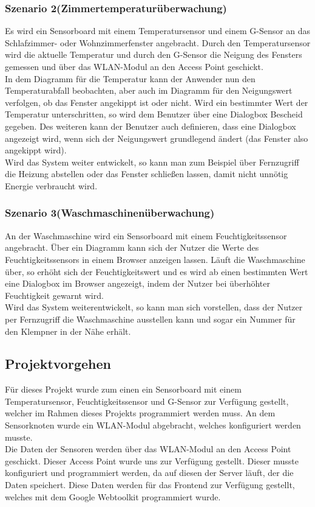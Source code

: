 \documentclass[12pt,a4paper,twoside]{article}
\begin{document}
\subsubsection{Szenario 2(Zimmertemperaturüberwachung)}
Es wird ein Sensorboard mit einem Temperatursensor und einem G-Sensor an das Schlafzimmer- oder Wohnzimmerfenster angebracht. Durch den Temperatursensor wird die aktuelle Temperatur und durch den G-Sensor die Neigung des Fensters gemessen und über das WLAN-Modul an den Access Point geschickt. \\
In dem Diagramm für die Temperatur kann der Anwender nun den Temperaturabfall beobachten, aber auch im Diagramm für den Neigungswert verfolgen, ob das Fenster angekippt ist oder nicht.
Wird ein bestimmter Wert der Temperatur unterschritten, so wird dem Benutzer über eine Dialogbox Bescheid gegeben. Des weiteren kann der Benutzer auch definieren, dass eine Dialogbox angezeigt wird, wenn sich der Neigungswert grundlegend ändert (das Fenster also angekippt wird). \\
Wird das System weiter entwickelt, so kann man zum Beispiel über Fernzugriff die Heizung abstellen oder das Fenster schließen lassen, damit nicht unnötig Energie verbraucht wird.

\subsubsection{Szenario 3(Waschmaschinenüberwachung)}
An der Waschmaschine wird ein Sensorboard mit einem Feuchtigkeitssensor angebracht. Über ein Diagramm kann sich der Nutzer die Werte des Feuchtigkeitssensors in einem Browser anzeigen lassen. Läuft die Waschmaschine über, so erhöht sich der Feuchtigkeitswert und es wird ab einen bestimmten Wert eine Dialogbox im Browser angezeigt, indem der Nutzer bei überhöhter Feuchtigkeit gewarnt wird. \\
Wird das System weiterentwickelt, so kann man sich vorstellen, dass der Nutzer per Fernzugriff die Waschmaschine ausstellen kann und sogar ein Nummer für den Klempner in der Nähe erhält.

\subsection{Projektvorgehen}
Für dieses Projekt wurde zum einen ein Sensorboard mit einem Temperatursensor, Feuchtigkeitssensor und G-Sensor zur Verfügung gestellt, welcher im Rahmen dieses Projekts programmiert werden muss. An dem Sensorknoten wurde ein WLAN-Modul abgebracht, welches konfiguriert werden musste.\\
Die Daten der Sensoren werden über das WLAN-Modul an den Access Point geschickt. Dieser Access Point wurde uns zur Verfügung gestellt. Dieser musste konfiguriert und programmiert werden, da auf diesen der Server läuft, der die Daten speichert. Diese Daten werden für das Frontend zur Verfügung gestellt, welches mit dem Google Webtoolkit programmiert wurde. 
\end{document}
